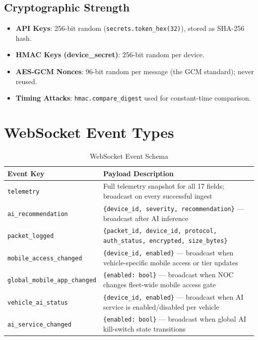 \documentclass[12pt,a4paper]{report}
\begin{document}
\section{Cryptographic Strength}

\begin{itemize}
  \item \textbf{API Keys}: 256-bit random (\texttt{secrets.token\_hex(32)}), stored as SHA-256 hash.
  \item \textbf{HMAC Keys (device\_secret)}: 256-bit random per device.
  \item \textbf{AES-GCM Nonces}: 96-bit random per message (the GCM standard); never reused.
  \item \textbf{Timing Attacks}: \texttt{hmac.compare\_digest} used for constant-time comparison.
\end{itemize}

\appendix

\chapter{WebSocket Event Types}

\begin{table}[H]
\centering
\caption{WebSocket Event Schema}
\label{tab:ws-events}
\begin{tabularx}{\textwidth}{L{5.8cm} X}
\toprule
\textbf{Event Key} & \textbf{Payload Description} \\
\midrule
\texttt{telemetry} & Full telemetry snapshot for all 17 fields; broadcast on every successful ingest \\
\texttt{ai\_recommendation} & \texttt{\{device\_id, severity, recommendation\}} — broadcast after AI inference \\
\texttt{packet\_logged} & \texttt{\{packet\_id, device\_id, protocol,} \allowbreak \texttt{auth\_status, encrypted, size\_bytes\}} \\
\texttt{mobile\_access\_changed} & \texttt{\{device\_id, enabled\}} — broadcast when vehicle-specific mobile access or tier updates \\
\texttt{global\_mobile\_app\_changed} & \texttt{\{enabled: bool\}} — broadcast when NOC changes fleet-wide mobile access gate \\
\texttt{vehicle\_ai\_status} & \texttt{\{device\_id, enabled\}} — broadcast when AI service is enabled/disabled per vehicle \\
\texttt{ai\_service\_changed} & \texttt{\{enabled: bool\}} — broadcast when global AI kill-switch state transitions \\
\bottomrule
\end{tabularx}
\end{table}
\end{document}
